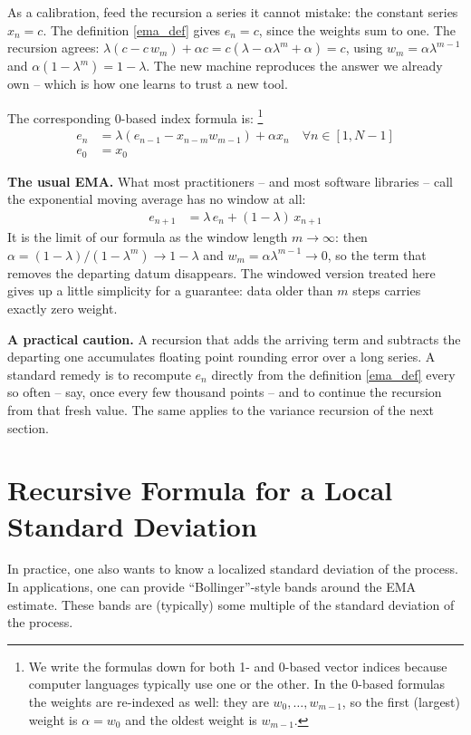 \documentclass{article}
\begin{document}
As a calibration, feed the recursion a series it cannot mistake: the
constant series $x_n = c$. The definition \eqref{ema_def} gives $e_n = c$,
since the weights sum to one. The recursion agrees:
$\lambda(c - c\, w_m) + \alpha c = c\left(\lambda - \alpha \lambda^m + \alpha\right) = c$,
using $w_m = \alpha \lambda^{m-1}$ and $\alpha (1 - \lambda^m) = 1 - \lambda$.
The new machine reproduces the answer we already own -- which is how one
learns to trust a new tool.

The corresponding 0-based index formula is:%
\footnote{We write the formulas down for both 1- and 0-based vector indices because
computer languages typically use one or the other. In the 0-based formulas the
weights are re-indexed as well: they are $w_0, \ldots, w_{m-1}$, so the first
(largest) weight is $\alpha = w_0$ and the oldest weight is $w_{m-1}$.}
\begin{align}
    e_{n} &=  \lambda \left( e_{n-1} - x_{n-m} w_{m-1} \right) + \alpha x_{n}  \quad \forall n \in [1, N-1] \\
    e_0   &=  x_0
\end{align}

{\bf The usual EMA.} What most practitioners -- and most software
libraries -- call the exponential moving average has no window at all:
\begin{align}
    e_{n+1} &= \lambda \, e_n + (1 - \lambda) \, x_{n+1}
\end{align}
It is the limit of our formula as the window length $m \rightarrow \infty$:
then $\alpha = (1 - \lambda)/(1 - \lambda^m) \rightarrow 1 - \lambda$ and
$w_m = \alpha \lambda^{m-1} \rightarrow 0$, so the term that removes the
departing datum disappears. The windowed version treated here gives up a
little simplicity for a guarantee: data older than $m$ steps carries exactly
zero weight.

{\bf A practical caution.} A recursion that adds the arriving term and
subtracts the departing one accumulates floating point rounding error over
a long series. A standard remedy is to recompute $e_n$ directly from the
definition \eqref{ema_def} every so often -- say, once every few thousand
points -- and to continue the recursion from that fresh value. The same
applies to the variance recursion of the next section.

\section{Recursive Formula for a Local Standard Deviation}
In practice, one also wants to know a localized standard deviation of the process.
In applications, one can provide ``Bollinger''-style bands around the EMA estimate.
These bands are (typically) some multiple of the standard deviation of the process.
\end{document}
